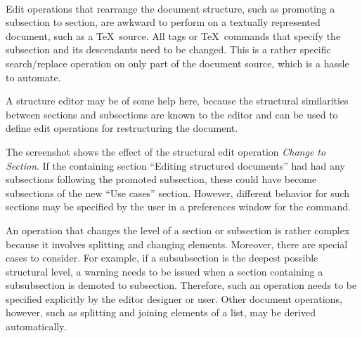 
\\

Edit operations that rearrange the document structure, such as promoting a subsection to section, are awkward to perform on a textually represented document, such as a \TeX\ source. All tags or \TeX\ commands that specify the subsection and its descendants need to be changed. This is a rather specific search/replace operation on only part of the document source, which is a hassle to automate.

A structure editor may be of some help here, because the structural similarities between sections and subsections are known to the editor and can be used to define edit operations for restructuring the document.

 
The screenshot shows the effect of the structural edit operation {\em Change to Section}. If the containing section ``Editing structured documents'' had had any subsections following the promoted subsection, these could have become subsections of the new ``Use cases'' section. However, different behavior for such sections may be specified by the user in a preferences window for the command.

An operation that changes the level of a section or subsection is rather complex because it involves splitting and changing elements. Moreover, there are special cases to consider. For example, if a subsubsection is the deepest possible structural level, a warning needs to be issued when a section containing a subsubsection is demoted to subsection. Therefore, such an operation needs to be specified explicitly by the editor designer or user. Other document operations, however, such as splitting and joining elements of a list, may be derived automatically.

